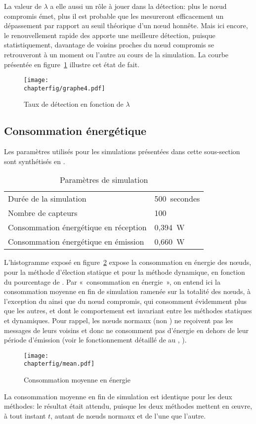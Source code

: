 La valeur de $\lambda$ a elle aussi un rôle à jouer dans la détection: plus le nœud compromis émet, plus il est probable que les \cns mesureront efficacement un dépassement par rapport au seuil théorique d'un nœud honnête.
Mais ici encore, le renouvellement rapide des \cns apporte une meilleure détection, puisque statistiquement, davantage de voisins proches du nœud compromis se retrouveront \cn à un moment ou l'autre au cours de la simulation.
La courbe présentée en figure~\ref{sa:fig:graphe4} illustre cet état de fait.
\begin{figure}[H]
    \centering
    \texttt{[image: \\chapterfig/graphe4.pdf]}
    \caption{Taux de détection en fonction de $\lambda$}\label{sa:fig:graphe4}
\end{figure}

    \subsection{Consommation énergétique}

Les paramètres utilisés pour les simulations présentées dans cette sous-section sont synthétisés en .
\begin{table}[H]
    \centering
    \caption{Paramètres de simulation}\label{sa:table:parametres2}
    \medskip
    \begin{tabular}{ll}
        \toprule
        Durée de la simulation                & 500~secondes\\
        Nombre de capteurs                    & 100\\
        Consommation énergétique en réception & 0,394~W\\
        Consommation énergétique en émission  & 0,660~W\\
        \bottomrule
    \end{tabular}
\end{table}
L'histogramme exposé en figure~\ref{sa:fig:conso-moyenne} expose la consommation en énergie des nœuds, pour la méthode d'élection statique et pour la méthode dynamique, en fonction du pourcentage de \cns.
Par «~consommation en énergie~», on entend ici la consommation moyenne en fin de simulation ramenée sur la totalité des nœuds, à l'exception du \ch ainsi que du nœud compromis, qui consomment évidemment plus que les autres, et dont le comportement est invariant entre les méthodes statiques et dynamiques.
Pour rappel, les nœuds normaux (non \cns) ne reçoivent pas les messages de leurs voisins et donc ne consomment pas d'énergie en dehors de leur période d'émission (voir le fonctionnement détaillé de \leach au , ).
\begin{figure}[H]
    \centering
    \texttt{[image: \\chapterfig/mean.pdf]}
    \caption{Consommation moyenne en énergie}\label{sa:fig:conso-moyenne}
\end{figure}
La consommation moyenne en fin de simulation est identique pour les deux méthodes: le résultat était attendu, puisque les deux méthodes mettent en œuvre, à tout instant $t$, autant de nœuds normaux et de \cns l'une que l'autre.

